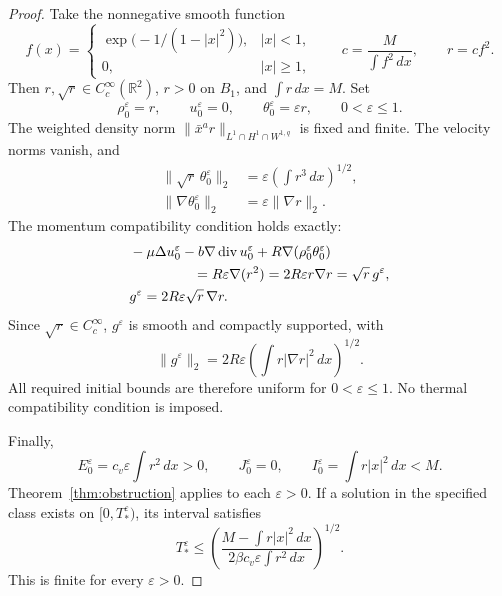 \documentclass[10pt,twoside]{article}
\newcommand{\R}{\mathbb R}
\newcommand{\dd}{\,dx}
\newcommand{\Div}{\operatorname{div}}
\newcommand{\norm}[2]{\lVert#1\rVert_{#2}}
\begin{document}
\begin{proof}
Take the nonnegative smooth function
\[
 f(x)=
 \begin{cases}
 \exp\bigl(-1/(1-|x|^2)\bigr),&|x|<1,\\
 0,&|x|\ge1,
 \end{cases}
 \qquad
 c=\frac{M}{\int f^2\dd},
 \qquad r=cf^2.
\]
Then $r,\sqrt r\in C_c^\infty(\R^2)$, $r>0$ on $B_1$, and
$\int r\dd=M$. Set
\begin{equation}
 \rho_0^\varepsilon=r,\qquad
 u_0^\varepsilon=0,\qquad
 \theta_0^\varepsilon=\varepsilon r,
 \qquad 0<\varepsilon\le1.
 \label{eq:familydefinition}
\end{equation}
The weighted density norm
$\norm{\bar x^a r}{L^1\cap H^1\cap W^{1,q}}$ is fixed and finite.
The velocity norms vanish, and
\begin{equation}
 \begin{aligned}
 \norm{\sqrt r\,\theta_0^\varepsilon}{2}
       &=\varepsilon\left(\int r^3\dd\right)^{1/2},\\
 \norm{\nabla\theta_0^\varepsilon}{2}
       &=\varepsilon\norm{\nabla r}{2}.
 \end{aligned}\label{eq:familynorms}
\end{equation}
The momentum compatibility condition holds exactly:
\begin{align}
 &-\mu\Delta u_0^\varepsilon
       -b\nabla\Div u_0^\varepsilon
       +R\nabla(\rho_0^\varepsilon\theta_0^\varepsilon)\notag\\
 &\hspace{16mm}=R\varepsilon\nabla(r^2)
       =2R\varepsilon r\nabla r
       =\sqrt r\,g^\varepsilon,\notag\\
 &g^\varepsilon=2R\varepsilon\sqrt r\,\nabla r.
 \label{eq:familycompatibility}
\end{align}
Since $\sqrt r\in C_c^\infty$, $g^\varepsilon$ is smooth and
compactly supported, with
\begin{equation}
 \norm{g^\varepsilon}{2}
       =2R\varepsilon
                \left(\int r|\nabla r|^2\dd\right)^{1/2}.
 \label{eq:familygbound}
\end{equation}
All required initial bounds are therefore uniform for
$0<\varepsilon\le1$. No thermal compatibility condition is imposed.

Finally,
\begin{equation}
 E_0^\varepsilon=c_v\varepsilon\int r^2\dd>0,\qquad
 J_0^\varepsilon=0,\qquad
 I_0^\varepsilon=\int r|x|^2\dd<M.
 \label{eq:familyenergy}
\end{equation}
Theorem~\ref{thm:obstruction} applies to each $\varepsilon>0$.
If a solution in the specified class exists on $[0,T_*^\varepsilon)$,
its interval satisfies
\begin{equation}
 T_*^\varepsilon
       \le\left(\frac{M-\int r|x|^2\dd}
                 {2\beta c_v\varepsilon\int r^2\dd}\right)^{1/2}.
 \label{eq:familylifespan}
\end{equation}
This is finite for every $\varepsilon>0$.
\end{proof}
\end{document}
